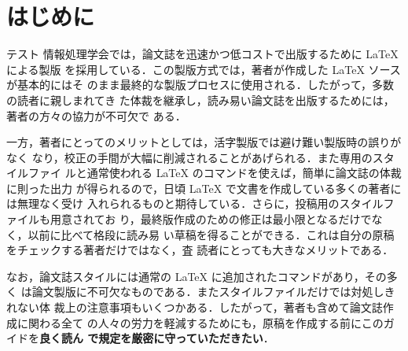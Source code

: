 \section{はじめに}
テスト
情報処理学会では，論文誌を迅速かつ低コストで出版するために {\LaTeX} による製版
を採用している．この製版方式では，著者が作成した {\LaTeX} ソースが基本的にはそ
のまま最終的な製版プロセスに使用される．したがって，多数の読者に親しまれてき
た体裁を継承し，読み易い論文誌を出版するためには，著者の方々の協力が不可欠で
ある．

一方，著者にとってのメリットとしては，活字製版では避け難い製版時の誤りがなく
なり，校正の手間が大幅に削減されることがあげられる．また専用のスタイルファイ
ルと通常使われる {\LaTeX} のコマンドを使えば，簡単に論文誌の体裁に則った出力
が得られるので，日頃 {\LaTeX} で文書を作成している多くの著者には無理なく受け
入れられるものと期待している．さらに，投稿用のスタイルファイルも用意されてお
り，最終版作成のための修正は最小限となるだけでなく，以前に比べて格段に読み易
い草稿を得ることができる．これは自分の原稿をチェックする著者だけではなく，査
読者にとっても大きなメリットである．

なお，論文誌スタイルには通常の {\LaTeX} に追加されたコマンドがあり，その多く
は論文製版に不可欠なものである．またスタイルファイルだけでは対処しきれない体
裁上の注意事項もいくつかある．したがって，著者も含めて論文誌作成に関わる全て
の人々の労力を軽減するためにも，原稿を作成する前にこのガイドを{\bf 良く読ん
で規定を厳密に守っていただきたい}．



